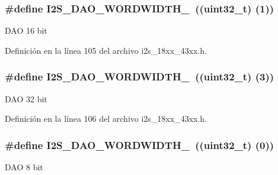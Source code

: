 \subsubsection[{\texorpdfstring{I2\+S\+\_\+\+D\+A\+O\+\_\+\+W\+O\+R\+D\+W\+I\+D\+T\+H\+\_\+16}{I2S_DAO_WORDWIDTH_16}}]{\setlength{\rightskip}{0pt plus 5cm}\#define I2\+S\+\_\+\+D\+A\+O\+\_\+\+W\+O\+R\+D\+W\+I\+D\+T\+H\+\_~((uint32\+\_\+t) (1))}\hypertarget{group___i2_s__18_x_x__43_x_x_gaf48ba0298cdb6828567de0df29abcb4d}{}\label{group___i2_s__18_x_x__43_x_x_gaf48ba0298cdb6828567de0df29abcb4d}
D\+AO 16 bit 

Definición en la línea 105 del archivo i2s\+\_\+18xx\+\_\+43xx.\+h.

\subsubsection[{\texorpdfstring{I2\+S\+\_\+\+D\+A\+O\+\_\+\+W\+O\+R\+D\+W\+I\+D\+T\+H\+\_\+32}{I2S_DAO_WORDWIDTH_32}}]{\setlength{\rightskip}{0pt plus 5cm}\#define I2\+S\+\_\+\+D\+A\+O\+\_\+\+W\+O\+R\+D\+W\+I\+D\+T\+H\+\_~((uint32\+\_\+t) (3))}\hypertarget{group___i2_s__18_x_x__43_x_x_gaa6666d92294cc244c41fd510fb7de31d}{}\label{group___i2_s__18_x_x__43_x_x_gaa6666d92294cc244c41fd510fb7de31d}
D\+AO 32 bit 

Definición en la línea 106 del archivo i2s\+\_\+18xx\+\_\+43xx.\+h.

\subsubsection[{\texorpdfstring{I2\+S\+\_\+\+D\+A\+O\+\_\+\+W\+O\+R\+D\+W\+I\+D\+T\+H\+\_\+8}{I2S_DAO_WORDWIDTH_8}}]{\setlength{\rightskip}{0pt plus 5cm}\#define I2\+S\+\_\+\+D\+A\+O\+\_\+\+W\+O\+R\+D\+W\+I\+D\+T\+H\+\_~((uint32\+\_\+t) (0))}\hypertarget{group___i2_s__18_x_x__43_x_x_ga9e390ef13bf52d00c311ca64d46c5ac2}{}\label{group___i2_s__18_x_x__43_x_x_ga9e390ef13bf52d00c311ca64d46c5ac2}
D\+AO 8 bit 

